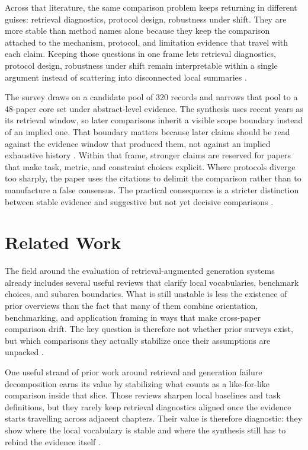 \documentclass[a4paper,11pt]{article}
\begin{document}
Across that literature, the same comparison problem keeps returning in different guises: retrieval diagnostics, protocol design, robustness under shift. They are more stable than method names alone because they keep the comparison attached to the mechanism, protocol, and limitation evidence that travel with each claim. Keeping those questions in one frame lets retrieval diagnostics, protocol design, robustness under shift remain interpretable within a single argument instead of scattering into disconnected local summaries \citep{Kovalskii2026Domain,Tian2026Predicting,Caruzzo2026Deceptive,Ding2026Attribution}.

The survey draws on a candidate pool of 320 records and narrows that pool to a 48-paper core set under abstract-level evidence. The synthesis uses recent years as its retrieval window, so later comparisons inherit a visible scope boundary instead of an implied one. That boundary matters because later claims should be read against the evidence window that produced them, not against an implied exhaustive history \citep{Murugaraj2025Ragvue,Nematov2025Source,SaadFalcon2023Ares,Upadhyay2026Overview}. Within that frame, stronger claims are reserved for papers that make task, metric, and constraint choices explicit. Where protocols diverge too sharply, the paper uses the citations to delimit the comparison rather than to manufacture a false consensus. The practical consequence is a stricter distinction between stable evidence and suggestive but not yet decisive comparisons \citep{Yao2026Authoritybench,An2026Fresco,Li2026Mrag,Guder2026Rage}.
\section{Related Work}


The field around the evaluation of retrieval-augmented generation systems already includes several useful reviews that clarify local vocabularies, benchmark choices, and subarea boundaries. What is still unstable is less the existence of prior overviews than the fact that many of them combine orientation, benchmarking, and application framing in ways that make cross-paper comparison drift. The key question is therefore not whether prior surveys exist, but which comparisons they actually stabilize once their assumptions are unpacked \citep{Sun2026Robust,Kim2024Learning,Salemi2024Evaluating,Taiwo2026Evaluating}.

One useful strand of prior work around retrieval and generation failure decomposition earns its value by stabilizing what counts as a like-for-like comparison inside that slice. Those reviews sharpen local baselines and task definitions, but they rarely keep retrieval diagnostics aligned once the evidence starts travelling across adjacent chapters. Their value is therefore diagnostic: they show where the local vocabulary is stable and where the synthesis still has to rebind the evidence itself \citep{Kovalskii2026Domain,Tian2026Predicting,Caruzzo2026Deceptive,Ding2026Attribution}.
\end{document}

